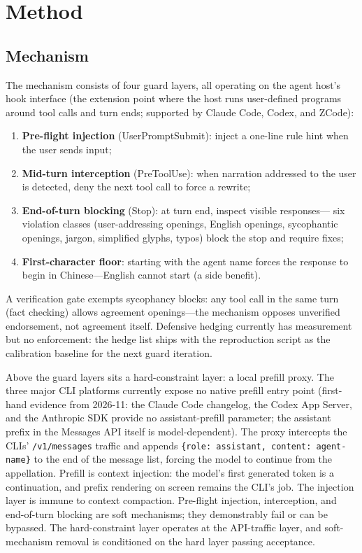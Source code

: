 \documentclass[10pt,twocolumn]{article}
\begin{document}
\section{Method}\label{sec:method}
\subsection{Mechanism}
The mechanism consists of four guard layers, all operating on the agent host's hook
interface (the extension point where the host runs user-defined programs around tool
calls and turn ends; supported by Claude Code, Codex, and ZCode):
\begin{enumerate}
  \item \textbf{Pre-flight injection} (UserPromptSubmit): inject a one-line rule hint
        when the user sends input;
  \item \textbf{Mid-turn interception} (PreToolUse): when narration addressed to the
        user is detected, deny the next tool call to force a rewrite;
  \item \textbf{End-of-turn blocking} (Stop): at turn end, inspect visible responses---
        six violation classes (user-addressing openings, English openings, sycophantic
        openings, jargon, simplified glyphs, typos) block the stop and require fixes;
  \item \textbf{First-character floor}: starting with the agent name forces the response
        to begin in Chinese---English cannot start (a side benefit).
\end{enumerate}
A verification gate exempts sycophancy blocks: any tool call in the same turn (fact
checking) allows agreement openings---the mechanism opposes unverified endorsement,
not agreement itself. Defensive hedging currently has measurement but no enforcement:
the hedge list ships with the reproduction script as the calibration baseline for the
next guard iteration.

Above the guard layers sits a hard-constraint layer: a local prefill proxy. The three
major CLI platforms currently expose no native prefill entry point (first-hand evidence
from 2026-11: the Claude Code changelog, the Codex App Server, and the Anthropic SDK
provide no assistant-prefill parameter; the assistant prefix in the Messages API itself
is model-dependent). The proxy intercepts the CLIs' \texttt{/v1/messages} traffic and
appends \texttt{\{role: assistant, content: agent-name\}} to the end of the message
list, forcing the model to continue from the appellation. Prefill is context injection:
the model's first generated token is a continuation, and prefix rendering on screen
remains the CLI's job. The injection layer is immune to context compaction. Pre-flight
injection, interception, and end-of-turn blocking are soft mechanisms; they demonstrably
fail or can be bypassed. The hard-constraint layer operates at the API-traffic layer,
and soft-mechanism removal is conditioned on the hard layer passing acceptance.
\end{document}
